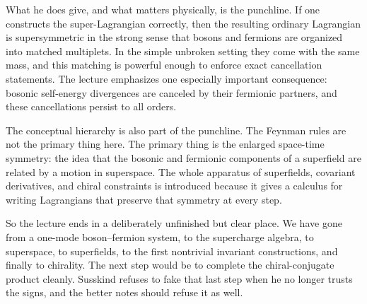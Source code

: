 What he does give, and what matters physically, is the punchline. If one constructs the super-Lagrangian correctly, then the resulting ordinary Lagrangian is supersymmetric in the strong sense that bosons and fermions are organized into matched multiplets. In the simple unbroken setting they come with the same mass, and this matching is powerful enough to enforce exact cancellation statements. The lecture emphasizes one especially important consequence: bosonic self-energy divergences are canceled by their fermionic partners, and these cancellations persist to all orders.

The conceptual hierarchy is also part of the punchline. The Feynman rules are not the primary thing here. The primary thing is the enlarged space-time symmetry: the idea that the bosonic and fermionic components of a superfield are related by a motion in superspace. The whole apparatus of superfields, covariant derivatives, and chiral constraints is introduced because it gives a calculus for writing Lagrangians that preserve that symmetry at every step.

So the lecture ends in a deliberately unfinished but clear place. We have gone from a one-mode boson--fermion system, to the supercharge algebra, to superspace, to superfields, to the first nontrivial invariant constructions, and finally to chirality. The next step would be to complete the chiral-conjugate product cleanly. Susskind refuses to fake that last step when he no longer trusts the signs, and the better notes should refuse it as well.